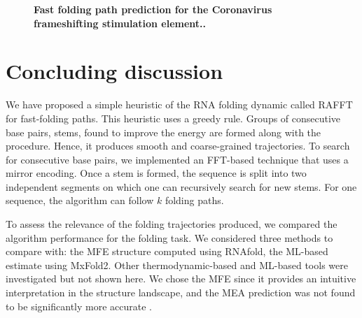 \documentclass[a4paper,12pt]{article}
\begin{document}
{{\begin{figure}
  \caption{\textbf{Fast folding path prediction for the Coronavirus frameshifting stimulation element.\label{folding_dynamics}.}}
\end{figure}

\clearpage
\section{Concluding discussion}
\label{sec:orgfa9b029}
We have proposed a simple heuristic of the RNA folding dynamic called RAFFT for
fast-folding paths. This heuristic uses a greedy rule. Groups of consecutive
base pairs, stems, found to improve the energy are formed along with the
procedure. Hence, it produces smooth and coarse-grained trajectories. To search
for consecutive base pairs, we implemented an FFT-based technique that uses a
mirror encoding. Once a stem is formed, the sequence is split into two
independent segments on which one can recursively search for new stems. For one
sequence, the algorithm can follow \(k\) folding paths.

To assess the relevance of the folding trajectories produced, we compared the
algorithm performance for the folding task. We considered three methods to
compare with: the MFE structure computed using RNAfold, the ML-based estimate
using MxFold2. Other thermodynamic-based and ML-based tools were investigated
but not shown here. We chose the MFE since it provides an intuitive
interpretation in the structure landscape, and the MEA prediction was not found
to be significantly more accurate \cite{mathews19_how_to_bench_rna_secon}.

}}
\end{document}
